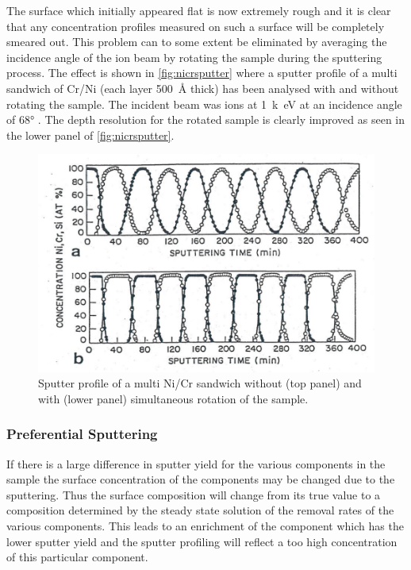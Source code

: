 The surface which initially appeared flat is now extremely rough and it is clear that any concentration profiles measured on such a surface will be completely smeared out. This problem can to some extent be eliminated by averaging the incidence angle of the ion beam by rotating the sample during the sputtering process. The effect is shown in \autoref{fig:nicrsputter} where a sputter profile of a multi sandwich of Cr/Ni (each layer \SI{500}{\angstrom} thick) has been analysed with and without rotating the sample. The incident beam was  ions at \SI{1}{k\electronvolt} at an incidence angle of \ang{68} \cite{zalar}. The depth resolution for the rotated sample is clearly improved as seen in the lower panel of \autoref{fig:nicrsputter}.

\begin{figure}[h!]
	\begin{center}
	\includegraphics[scale=3.5]{figures/07_07.png}
	\caption{Sputter profile of a multi Ni/Cr sandwich without (top panel) and with (lower panel) simultaneous rotation of the sample.}
	\label{fig:nicrsputter}
	\end{center}
\end{figure}

\subsubsection{Preferential Sputtering}
If there is a large difference in sputter yield for the various components in the sample the surface concentration of the components may be changed due to the sputtering. Thus the surface composition will change from its true value to a composition determined by the steady state solution of the removal rates of the various components. This leads to an enrichment of the component which has the lower sputter yield and the sputter profiling will reflect a too high concentration of this particular component.

